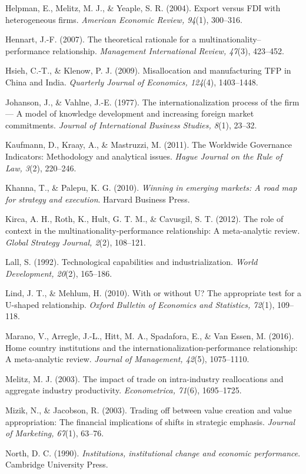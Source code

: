 \documentclass[
  a4paper,
  13pt]{extreport}
\begin{document}
Helpman, E., Melitz, M. J., \& Yeaple, S. R. (2004). Export versus FDI
with heterogeneous firms. \emph{American Economic Review, 94}(1),
300--316.

Hennart, J.-F. (2007). The theoretical rationale for a
multinationality--performance relationship. \emph{Management
International Review, 47}(3), 423--452.

Hsieh, C.-T., \& Klenow, P. J. (2009). Misallocation and manufacturing
TFP in China and India. \emph{Quarterly Journal of Economics, 124}(4),
1403--1448.

Johanson, J., \& Vahlne, J.-E. (1977). The internationalization process
of the firm --- A model of knowledge development and increasing foreign
market commitments. \emph{Journal of International Business Studies,
8}(1), 23--32.

Kaufmann, D., Kraay, A., \& Mastruzzi, M. (2011). The Worldwide
Governance Indicators: Methodology and analytical issues. \emph{Hague
Journal on the Rule of Law, 3}(2), 220--246.

Khanna, T., \& Palepu, K. G. (2010). \emph{Winning in emerging markets:
A road map for strategy and execution}. Harvard Business Press.

Kirca, A. H., Roth, K., Hult, G. T. M., \& Cavusgil, S. T. (2012). The
role of context in the multinationality-performance relationship: A
meta-analytic review. \emph{Global Strategy Journal, 2}(2), 108--121.

Lall, S. (1992). Technological capabilities and industrialization.
\emph{World Development, 20}(2), 165--186.

Lind, J. T., \& Mehlum, H. (2010). With or without U? The appropriate
test for a U-shaped relationship. \emph{Oxford Bulletin of Economics and
Statistics, 72}(1), 109--118.

Marano, V., Arregle, J.-L., Hitt, M. A., Spadafora, E., \& Van Essen, M.
(2016). Home country institutions and the
internationalization-performance relationship: A meta-analytic review.
\emph{Journal of Management, 42}(5), 1075--1110.

Melitz, M. J. (2003). The impact of trade on intra-industry
reallocations and aggregate industry productivity. \emph{Econometrica,
71}(6), 1695--1725.

Mizik, N., \& Jacobson, R. (2003). Trading off between value creation
and value appropriation: The financial implications of shifts in
strategic emphasis. \emph{Journal of Marketing, 67}(1), 63--76.

North, D. C. (1990). \emph{Institutions, institutional change and
economic performance}. Cambridge University Press.
\end{document}
